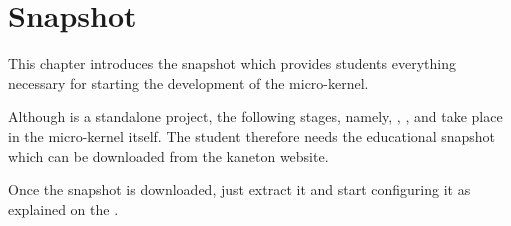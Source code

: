%
%
%
%
%
%

%
%

\chapter{Snapshot}
\label{chapter:snapshot}

This chapter introduces the snapshot which provides students everything
necessary for starting the development of the  micro-kernel.

\newpage

%
%

Although  is a standalone project, the following stages, namely,
, ,  and  take place in the micro-kernel
itself. The student therefore needs the educational snapshot which can be
downloaded from the kaneton website.

Once the snapshot is downloaded, just extract it and start configuring it
as explained on the  .
